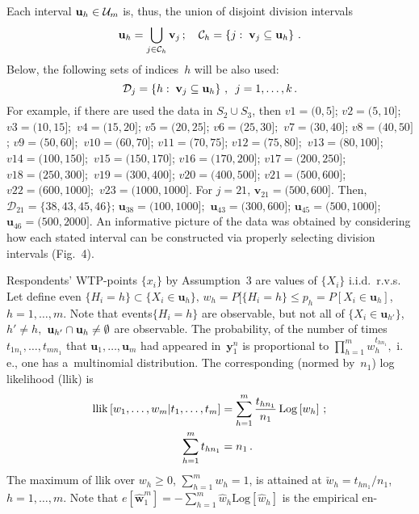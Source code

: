 \begin{multicols}{2}
    Each interval ${\bf u}_h \in
  \mathcal{U}_m$ is,  thus, the union of disjoint division intervals
 $$
   \mathbf{u}_h = \bigcup_{j\in\mathcal{C}_h} \mathbf{v}_j\,;
    \quad \mathcal{C}_h =\left\{ j:\; {\bf v}_j \subseteq \mathbf{u}_h\right\} \,.
    $$
Below,  the following sets of indices~$h$ will be also used:
$$
\mathcal{D}_j= \left\{ h:\; \mathbf{v}_j \subseteq \mathbf{u}_h \right\}\,, \enskip j=1,
    \ldots, k\,. 
    $$
For example, if there are used the data in $S_2\cup S_3$, then
$v1 = (0, 5]$; $v2 = (5, 10]$; $v3 = (10, 15];$  
$ v4$\linebreak $ = (15, 20]$; $v5 = (20, 25]$; $v6 = (25, 30];$ 
$ v7$\linebreak $ = (30, 40]$; $v8 = (40, 50]$;  $v9 = (50, 60];$ 
$  v10 = (60, 70]$; $v11 = (70, 75]$;  $v12 = (75, 80];$ 
$  v13 = (80, 100]$; $v14 = (100, 150];$ 
$  v15 = (150, 170]$; $v16 = (170, 200]$; 
$ v17 = (200, 250]$;  $v18 = (250, 300];$ 
$v19 = (300, 400]$;     $v20 = (400, 500]$;
$ v21 = (500, 600]$;   $v22 = (600, 1000];$ 
$v23 = (1000, 1000]$. 
For $j=21$, $\mathbf{v}_{21} =(500, 600]$.
 Then,
$\mathcal{D}_{21} =\{ 38, 43, 45, 46 \}$; $\mathbf{u}_{38} =( 100, 1000];$ 
$ \mathbf{u}_{43} =( 300, 600]$;
$\mathbf{u}_{45} =( 500, 1000]$; 
$\mathbf{u}_{46} =( 500, 2000]$.
An informative picture of the data was obtained
by considering how each stated interval can be
constructed via properly selecting division intervals (Fig.~4).



Respondents' WTP-points $\{ x_i\}$   by Assumption~3
are values of $\{ X_i\}$ i.i.d.\ r.v.s.   Let define even
$ \{ H_i =h\} \subset\{ X_i\in \mathbf{u}_h\}, \, w_h= P[\{
H_i=h\}\le p_h$\linebreak $= P[X_i \in \mathbf{u}_h]$, $h=1, \ldots, m.$ 
Note that events\linebreak $\{ H_i =h\} $ are
 observable, but not all of  $\{ X_i \in \mathbf{u}_{h'}\}$, $h'\not= h,$
 $\mathbf{u}_{h'}\cap{\bf u}_h \not= \emptyset$ are
observable. The probability, of the number of times $ t_{1 n_1}, \ldots, t_{m n_1}$
that $\mathbf{u}_1, \ldots , \mathbf{u}_m$ had appeared in~$\mathbf{y}_1^n$ 
is proportional to $\prod_{h=1}^m w_h^{t_{h n_1}},$  i.\,e.,
one has a~multinomial distribution. The corresponding
(normed by~$n_1$) log likelihood (llik) is
\begin{align*}
  \mathrm{llik} \left[ w_1, \ldots, w_m \vert t_1, \ldots, t_m \right]&= \sum\limits_{h=1}^m
  \displaystyle\frac{\displaystyle t_{h n_1}\mathstrut}{\displaystyle n_1\mathstrut}\,\mathrm{Log} \left[w_h\right]\,;\\
  \sum\limits_{h=1}^m t_{h n_1} &=n_1\,.
\end{align*}
The maximum of llik over $w_h\ge 0$, $\sum_{h=1}^m w_h =1$,
is attained at $ \check w_h =t_{h n_1}/n_1$, $h=1, \ldots, m.$
 Note that $e[\hat{\mathbf{w}}_1^m ]= -\sum_{h=1}^m \hat{w}_h \mathrm{Log} 
 [\hat w_h]$ is the empirical en-\linebreak\vspace*{-12pt}
 

\end{multicols}
